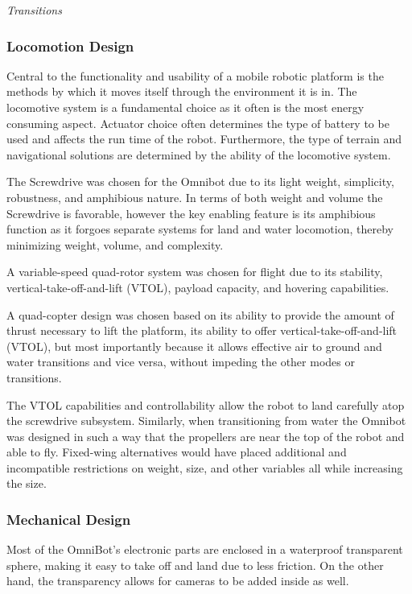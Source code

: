 \emph{Transitions}

\subsubsection{Locomotion Design}

Central to the functionality and usability of a mobile robotic platform is the methods by which it moves itself through the environment it is in. The locomotive system is a fundamental choice as it often is the most energy consuming aspect. Actuator choice often determines the type of battery to be used and affects the run time of the robot. Furthermore, the type of terrain and navigational solutions are determined by the ability of the locomotive system. 


The Screwdrive was chosen for the Omnibot due to its light weight, simplicity, robustness, and amphibious nature.  In terms of both weight and volume the Screwdrive is favorable, however the key enabling feature is its amphibious function as it forgoes separate systems for land and water locomotion, thereby minimizing weight, volume, and complexity. 

A variable-speed quad-rotor system was chosen for flight due to its stability, vertical-take-off-and-lift (VTOL), payload capacity, and hovering capabilities. 

A quad-copter design was chosen based on its ability to provide the amount of thrust necessary to lift the platform, its ability to offer vertical-take-off-and-lift (VTOL), but most importantly because it allows effective air to ground and water transitions and vice versa, without impeding the other modes or transitions. 

The VTOL capabilities and controllability allow the robot to land carefully atop the screwdrive subsystem. Similarly, when transitioning from water the Omnibot was designed in such a way that the propellers are near the top of the robot and able to fly. Fixed-wing alternatives would have placed additional and incompatible restrictions on weight, size, and other variables all while increasing the size. 


\subsubsection{Mechanical Design}

Most of the OmniBot's electronic parts are enclosed in a waterproof transparent sphere, making it easy to take off and land due to less friction. On the other hand, the transparency allows for cameras to be added inside as well. 

